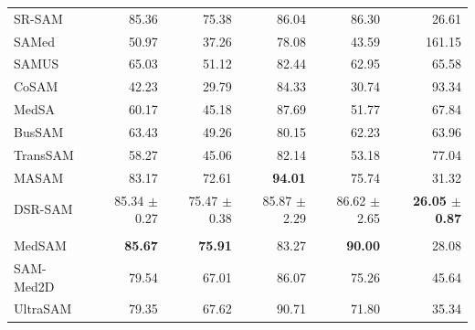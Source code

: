 \documentclass[10pt]{article}
\begin{document}
{\begin{longtable}{lrrrrr}
SR-SAM & 85.36 & 75.38 & 86.04 & 86.30 & 26.61 \\
SAMed & 50.97 & 37.26 & 78.08 & 43.59 & 161.15 \\
SAMUS & 65.03 & 51.12 & 82.44 & 62.95 & 65.58 \\
CoSAM & 42.23 & 29.79 & 84.33 & 30.74 & 93.34 \\
MedSA & 60.17 & 45.18 & 87.69 & 51.77 & 67.84 \\
BusSAM & 63.43 & 49.26 & 80.15 & 62.23 & 63.96 \\
TransSAM & 58.27 & 45.06 & 82.14 & 53.18 & 77.04 \\
MASAM & 83.17 & 72.61 & \textbf{94.01} & 75.74 & 31.32 \\
DSR-SAM & 85.34 $\pm$ 0.27 & 75.47 $\pm$ 0.38 & 85.87 $\pm$ 2.29 & 86.62 $\pm$ 2.65 & \textbf{26.05 $\pm$ 0.87} \\
\addlinespace[2pt]
\multicolumn{6}{l}{\textit{Zero-shot foundation models}} \\
MedSAM & \textbf{85.67} & \textbf{75.91} & 83.27 & \textbf{90.00} & 28.08 \\
SAM-Med2D & 79.54 & 67.01 & 86.07 & 75.26 & 45.64 \\
UltraSAM & 79.35 & 67.62 & 90.71 & 71.80 & 35.34 \\
\end{longtable}
}
\newpage
\end{document}
